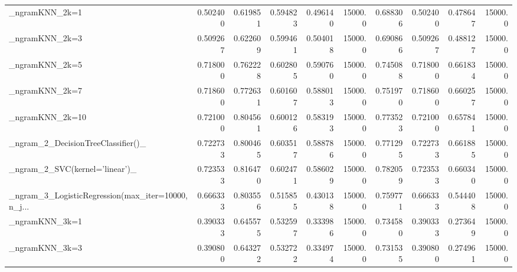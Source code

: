 \begin{tabular}{lrrrrrrrrr}
\_ngramKNN\_2k=1                                     &  0.502400 &         0.619851 &      0.594823 &        0.496140 &        15000.0 &            0.688306 &         0.502400 &           0.478647 &           15000.0 \\
\_ngramKNN\_2k=3                                     &  0.509267 &         0.622609 &      0.599461 &        0.504018 &        15000.0 &            0.690866 &         0.509267 &           0.488127 &           15000.0 \\
\_ngramKNN\_2k=5                                     &  0.718000 &         0.762228 &      0.602805 &        0.590760 &        15000.0 &            0.745088 &         0.718000 &           0.661834 &           15000.0 \\
\_ngramKNN\_2k=7                                     &  0.718600 &         0.772631 &      0.601607 &        0.588013 &        15000.0 &            0.751970 &         0.718600 &           0.660257 &           15000.0 \\
\_ngramKNN\_2k=10                                    &  0.721000 &         0.804561 &      0.600126 &        0.583193 &        15000.0 &            0.773523 &         0.721000 &           0.657841 &           15000.0 \\
\_ngram\_2\_DecisionTreeClassifier()\_                 &  0.722733 &         0.800465 &      0.603517 &        0.588786 &        15000.0 &            0.771295 &         0.722733 &           0.661885 &           15000.0 \\
\_ngram\_2\_SVC(kernel='linear')\_                     &  0.723533 &         0.816470 &      0.602471 &        0.586029 &        15000.0 &            0.782059 &         0.723533 &           0.660340 &           15000.0 \\
\_ngram\_3\_LogisticRegression(max\_iter=10000, n\_j... &  0.666333 &         0.803556 &      0.515855 &        0.430138 &        15000.0 &            0.759771 &         0.666333 &           0.544408 &           15000.0 \\
\_ngramKNN\_3k=1                                     &  0.390333 &         0.645575 &      0.532597 &        0.333986 &        15000.0 &            0.734580 &         0.390333 &           0.273649 &           15000.0 \\
\_ngramKNN\_3k=3                                     &  0.390800 &         0.643272 &      0.532722 &        0.334974 &        15000.0 &            0.731535 &         0.390800 &           0.274961 &           15000.0 \\

\end{tabular}
